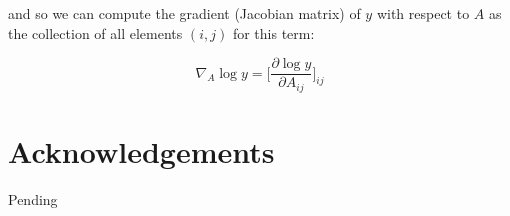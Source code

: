 \documentclass[12pt]{article}
\theoremstyle{definition}
\begin{document}
and so we can compute the gradient (Jacobian matrix) of $y$ with respect to $A$ as the collection of all elements $(i,j)$ for this term:

\begin{equation}
    \nabla_A \log y = \bigg[\frac{\partial \log y}{\partial A_{ij}} \bigg]_{ij}
\end{equation}

\newpage
\section{Acknowledgements}

Pending

\newpage 

\printbibliography
\end{document}
